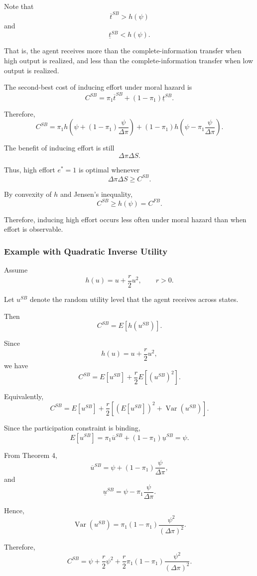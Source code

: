 Note that
\[
\overline t^{SB}>h(\psi)
\]
and
\[
\underline t^{SB}<h(\psi).
\]

That is, the agent receives more than the complete-information transfer when high output is realized, and less than the complete-information transfer when low output is realized.

The second-best cost of inducing effort under moral hazard is
\[
C^{SB}
=
\pi_1\overline t^{SB}
+
(1-\pi_1)\underline t^{SB}.
\]

Therefore,
\[
C^{SB}
=
\pi_1
h\left(
\psi
+
(1-\pi_1)\frac{\psi}{\Delta\pi}
\right)
+
(1-\pi_1)
h\left(
\psi
-
\pi_1\frac{\psi}{\Delta\pi}
\right).
\]

The benefit of inducing effort is still
\[
\Delta\pi\Delta S.
\]

Thus, high effort \(e^*=1\) is optimal whenever
\[
\Delta\pi\Delta S
\ge
C^{SB}.
\]

By convexity of \(h\) and Jensen's inequality,
\[
C^{SB}\ge h(\psi)=C^{FB}.
\]

Therefore, inducing high effort occurs less often under moral hazard than when effort is observable.

\subsubsection{Example with Quadratic Inverse Utility}

Assume
\[
h(u)=u+\frac{r}{2}u^2,
\qquad
r>0.
\]

Let \(u^{SB}\) denote the random utility level that the agent receives across states.

Then
\[
C^{SB}
=
E[h(u^{SB})].
\]

Since
\[
h(u)=u+\frac{r}{2}u^2,
\]
we have
\[
C^{SB}
=
E[u^{SB}]
+
\frac{r}{2}E[(u^{SB})^2].
\]

Equivalently,
\[
C^{SB}
=
E[u^{SB}]
+
\frac{r}{2}
\left[
(E[u^{SB}])^2
+
\operatorname{Var}(u^{SB})
\right].
\]

Since the participation constraint is binding,
\[
E[u^{SB}]
=
\pi_1\overline u^{SB}
+
(1-\pi_1)\underline u^{SB}
=
\psi.
\]

From Theorem 4,
\[
\overline u^{SB}
=
\psi
+
(1-\pi_1)\frac{\psi}{\Delta\pi},
\]
and
\[
\underline u^{SB}
=
\psi
-
\pi_1\frac{\psi}{\Delta\pi}.
\]

Hence,
\[
\operatorname{Var}(u^{SB})
=
\pi_1(1-\pi_1)
\frac{\psi^2}{(\Delta\pi)^2}.
\]

Therefore,
\[
C^{SB}
=
\psi
+
\frac{r}{2}\psi^2
+
\frac{r}{2}
\pi_1(1-\pi_1)
\frac{\psi^2}{(\Delta\pi)^2}.
\]

